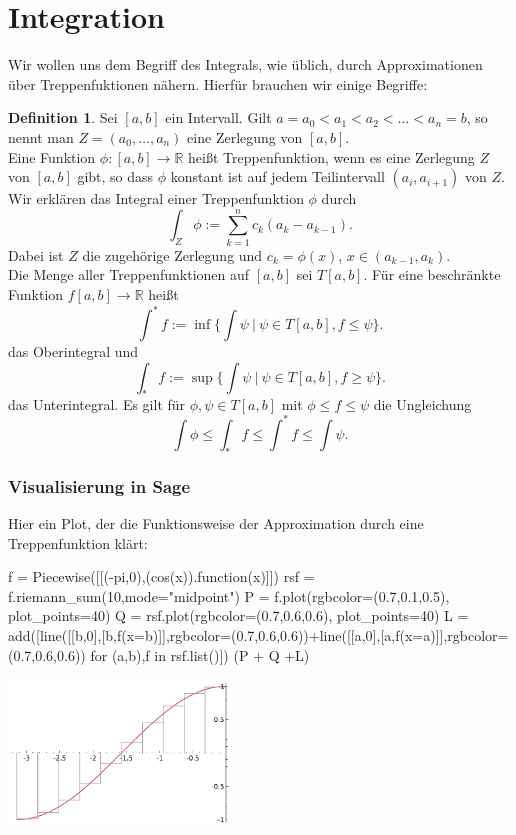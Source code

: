 \documentclass[fontsize=12pt,paper=a4,twoside,bibtotoc,idxtotoc,
liststotoc,pagesize,BCOR1.2cm,DIV15,chapterprefix,pagesize=pdftex]{scrbook}
\theoremstyle{plain}
\theoremstyle{definition}
\newtheorem{df}[equation]{Definition}
\theoremstyle{remark}
\begin{document}
\section{Integration}
Wir wollen uns dem Begriff des Integrals, wie üblich, durch Approximationen über Treppenfuktionen nähern. Hierfür 
brauchen wir einige Begriffe:
\begin{df}
Sei $[a,b]$ ein Intervall. Gilt $a=a_0 < a_1 <a_2 < \dots <
                                 a_n=b$, so nennt man $Z=(a_0, \dots
                                 ,a_n)$ eine Zerlegung von
                                 $[a,b]$.\\
Eine Funktion $\phi:[a,b] \rightarrow \mathbb{R}$ heißt 
                                 Treppenfunktion, wenn es eine
                                 Zerlegung $Z$ von $[a,b]$ gibt, so dass
                                 $\phi$ konstant ist auf jedem
                                 Teilintervall $(a_i,a_{i+1})$ von $Z$.\\
Wir erklären das Integral einer Treppenfunktion $\phi$ durch
\[\int_Z \phi := \sum_{k=1}^n c_k (a_k -a_{k-1}).\]
Dabei ist $Z$ die zugehörige Zerlegung und $c_k=\phi(x)$, $x\in
(a_{k-1},a_k)$.\\
Die Menge aller Treppenfunktionen auf $[a,b]$ sei $T[a,b]$.
Für eine beschränkte Funktion $f[a,b]\rightarrow \mathbb{R}$
heißt
\[ \int^*f:= \inf  \{ \int \psi \ | \ \psi \in T[a,b], f \leq \psi \}. \]
das Oberintegral und 
\[ \int_*f:= \sup  \{ \int \psi \ | \ \psi \in T[a,b], f \geq \psi \}.\]
das Unterintegral. Es gilt für $\phi, \psi \in T[a,b]$ mit
$\phi \leq f \leq \psi$ die Ungleichung
\[ \int \phi \leq \int_* f \leq \int^* f \leq \int \psi.\]
\end{df}
\subsubsection{Visualisierung in Sage}
Hier ein Plot, der die Funktionsweise der Approximation durch eine Treppenfunktion klärt:
\begin{sagein}
f = Piecewise([[(-pi,0),(cos(x)).function(x)]])
rsf = f.riemann_sum(10,mode="midpoint")
P = f.plot(rgbcolor=(0.7,0.1,0.5), plot_points=40)
Q = rsf.plot(rgbcolor=(0.7,0.6,0.6), plot_points=40)
L = add([line([[b,0],[b,f(x=b)]],rgbcolor=(0.7,0.6,0.6))+line([[a,0],[a,f(x=a)]],rgbcolor=(0.7,0.6,0.6)) for (a,b),f in rsf.list()])
(P + Q +L)
\end{sagein}
\begin{center}
\includegraphics[width=6cm]{riemann.pdf}
\end{center}
\end{document}
